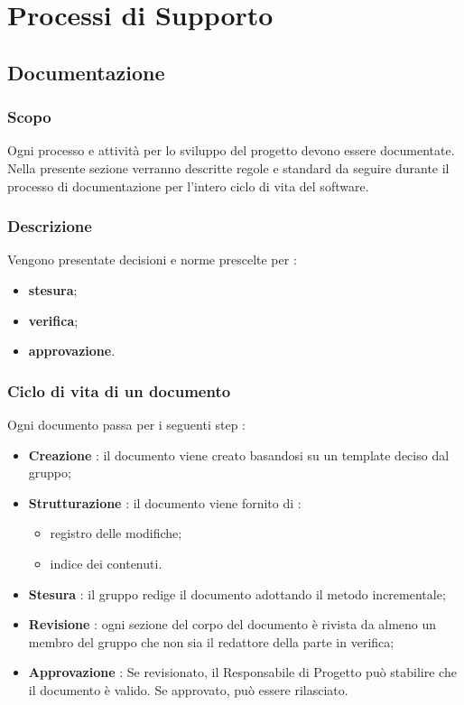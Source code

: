 \section{Processi di Supporto}
\subsection{Documentazione}
\subsubsection{Scopo}
Ogni processo e attività per lo sviluppo del progetto devono essere documentate. Nella presente sezione verranno descritte regole e standard da seguire durante il processo di documentazione per l’intero ciclo di vita del software.

\subsubsection{Descrizione}
Vengono presentate decisioni e norme prescelte per :
\begin{itemize}
  \item \textbf{stesura};
  \item \textbf{verifica};
  \item \textbf{approvazione}.
\end{itemize}

\subsubsection{Ciclo di vita di un documento}
Ogni documento passa per i seguenti step :
\begin{itemize}
  \item \textbf{Creazione} : il documento viene creato basandosi su un template deciso dal gruppo;
  \item \textbf{Strutturazione}  : il documento viene fornito di :
  \begin{itemize}
  		\item registro delle modifiche;
  		\item indice dei contenuti.
	\end{itemize}
  \item \textbf{Stesura} : il gruppo redige il documento adottando il metodo incrementale;
  \item \textbf{Revisione} : ogni sezione del corpo del documento è rivista da almeno un membro del gruppo che non sia il redattore della parte in verifica;
  \item \textbf{Approvazione} : Se revisionato, il Responsabile di Progetto può stabilire che il documento è valido. Se approvato, può essere rilasciato.
\end{itemize}

